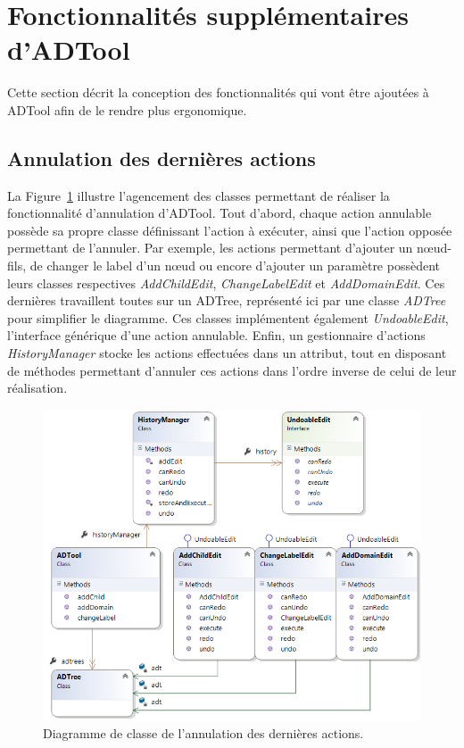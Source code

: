 \section{Fonctionnalités supplémentaires d'ADTool}
    \label{sec:ADTool}
    Cette section décrit la conception des fonctionnalités qui vont être ajoutées à ADTool afin de le rendre plus ergonomique.
    
    \subsection{Annulation des dernières actions}
    	La {\sc Figure}~{\ref{fig:ctrlz}} illustre l'agencement des classes permettant de réaliser la fonctionnalité d'annulation d'ADTool. Tout d'abord, chaque action annulable possède sa propre classe définissant l'action à exécuter, ainsi que l'action opposée permettant de l'annuler. Par exemple, les actions permettant d'ajouter un nœud-fils, de changer le label d'un nœud ou encore d'ajouter un paramètre possèdent leurs classes respectives \emph{AddChildEdit}, \emph{ChangeLabelEdit} et \emph{AddDomainEdit}. Ces dernières travaillent toutes sur un ADTree, représenté ici par une classe \emph{ADTree} pour simplifier le diagramme. Ces classes implémentent également \emph{UndoableEdit}, l'interface générique d'une action annulable. Enfin, un gestionnaire d'actions \emph{HistoryManager} stocke les actions effectuées dans un attribut, tout en disposant de méthodes permettant d'annuler ces actions dans l'ordre inverse de celui de leur réalisation.
    	
    	\begin{figure}[H]
	        \centering
	        \includegraphics[height=0.8\textwidth]{figure/ctrlz.png}
	        \caption{Diagramme de classe de l'annulation des dernières actions.}
	        \label{fig:ctrlz}
	    \end{figure}
    
